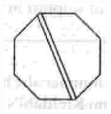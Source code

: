 \documentclass[10pt]{article}
\begin{document}
\includegraphics[max width=\textwidth, center]{2025_01_28_8470952b98110cec3aabg-124}
\end{document}
